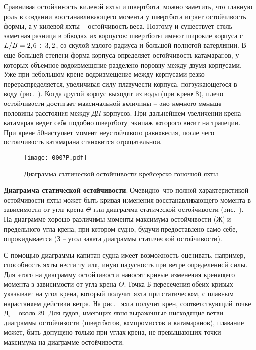 Сравнивая остойчивость килевой яхты и швертбота, можно заметить, что
главную роль в создании восстанавливающего момента у швертбота играет
остойчивость формы, а у килевой яхты \--- остойчивость веса. Поэтому и
существует столь заметная разница в обводах их корпусов: швертботы
имеют широкие корпуса с $L/B = 2,6 \div 3,2$, со скулой малого
радиуса и большой полнотой ватерлинии. В еще большей степени форма
корпуса определяет остойчивость катамаранов, у которых объемное
водоизмещение разделено поровну между двумя корпусами. Уже при
небольшом крене водоизмещение между корпусами резко
перераспределяется, увеличивая силу плавучести корпуса, погружающегося
в воду (рис.~). Когда другой корпус выходит из воды (при крене
8\gr), плечо остойчивости достигает максимальной величины \---
оно немного меньше половины расстояния между \textit{ДП} корпусов. При
дальнейшем увеличении крена катамаран ведет себя подобно швертботу,
экипаж которого висит на трапеции. При крене 50\gr наступает
момент неустойчивого равновесия, после чего остойчивость катамарана
становится отрицательной.

\begin{figure*}[htb]
  \centering
  \texttt{[image: 0007P.pdf]}
  \caption{Диаграмма статической остойчивости крейсерско-гоночной яхты}
  \label{fig:7}
\end{figure*}

\textbf{Диаграмма статической остойчивости}. Очевидно, что полной характеристикой остойчивости яхты может быть кривая изменения восстанавливающего момента  в зависимости от угла крена $\Theta$ или диаграмма статической остойчивости (рис.~). На диаграмме хорошо различимы моменты максимума остойчивости (Ж) и предельного угла крена, при котором судно, будучи предоставлено само себе, опрокидывается (З \--- угол заката диаграммы статической остойчивости).

С помощью диаграммы капитан судна имеет возможность оценивать, например, способность яхты нести ту или, иную парусность при ветре определенной силы. Для этого на диаграмму остойчивости наносят кривые изменения кренящего момента  в зависимости от угла крена $\Theta$. Точка Б пересечения обеих кривых указывает на угол крена, который получит яхта при статическом, с плавным нарастанием действии ветра. На рис.~ яхта получит крен, соответствующий точке Д, \--- около 29\gr. Для судов, имеющих явно выраженные нисходящие ветви диаграммы остойчивости (швертботов, компромиссов и катамаранов), плавание может, быть допущено только при углах крена, не превышающих точки максимума на диаграмме остойчивости. 


